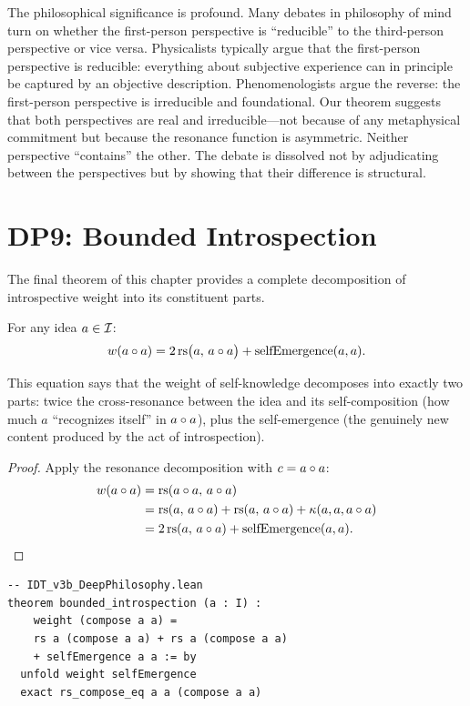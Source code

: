 The philosophical significance is profound. Many debates in philosophy
of mind turn on whether the first-person perspective is ``reducible''
to the third-person perspective or vice versa. Physicalists typically
argue that the first-person perspective is reducible: everything
about subjective experience can in principle be captured by an
objective description. Phenomenologists argue the reverse: the
first-person perspective is irreducible and foundational. Our theorem
suggests that both perspectives are real and irreducible---not because
of any metaphysical commitment but because the resonance function is
asymmetric. Neither perspective ``contains'' the other. The debate is
dissolved not by adjudicating between the perspectives but by showing
that their difference is structural.

\section{DP9: Bounded Introspection}

The final theorem of this chapter provides a complete decomposition of
introspective weight into its constituent parts.

\begin{theorem}
\label{thm:bounded-introspection}
For any idea $a \in \mathcal{I}$:
\[
w(a \circ a) = 2\,\mathrm{rs}\bigl(a,\, a \circ a\bigr)
+ \mathrm{selfEmergence}(a, a).
\]
\end{theorem}

This equation says that the weight of self-knowledge decomposes into
exactly two parts: twice the cross-resonance between the idea and its
self-composition (how much $a$ ``recognizes itself'' in $a \circ a$),
plus the self-emergence (the genuinely new content produced by the act
of introspection).

\begin{proof}
Apply the resonance decomposition with $c = a \circ a$:
\begin{align*}
w(a \circ a) &= \mathrm{rs}(a \circ a,\, a \circ a) \\
&= \mathrm{rs}(a,\, a \circ a) + \mathrm{rs}(a,\, a \circ a) +
\kappa(a, a, a \circ a) \\
&= 2\,\mathrm{rs}(a,\, a \circ a) + \mathrm{selfEmergence}(a, a).
\qedhere
\end{align*}
\end{proof}

\begin{lstlisting}
-- IDT_v3b_DeepPhilosophy.lean
theorem bounded_introspection (a : I) :
    weight (compose a a) =
    rs a (compose a a) + rs a (compose a a)
    + selfEmergence a a := by
  unfold weight selfEmergence
  exact rs_compose_eq a a (compose a a)
\end{lstlisting}

